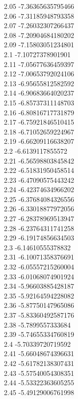 {2.05	-7.36365635795466\\
2.06	-7.31185948793358\\
2.07	-7.26032307266437\\
2.08	-7.20904684180202\\
2.09	-7.15803051234801\\
2.1	-7.10727378901901\\
2.11	-7.05677636459397\\
2.12	-7.00653792024106\\
2.13	-6.95655812582592\\
2.14	-6.90683664020237\\
2.15	-6.85737311148703\\
2.16	-6.80816717731879\\
2.17	-6.75921846510415\\
2.18	-6.71052659224967\\
2.19	-6.66209116638207\\
2.2	-6.6139117855572\\
2.21	-6.56598803845842\\
2.22	-6.51831950458514\\
2.23	-6.47090575443242\\
2.24	-6.42374634966202\\
2.25	-6.37684084326556\\
2.26	-6.33018877972056\\
2.27	-6.28378969513947\\
2.28	-6.23764311741258\\
2.29	-6.19174856634503\\
2.3	-6.14610555378832\\
2.31	-6.10071358376691\\
2.32	-6.05557215260004\\
2.33	-6.01068074901924\\
2.34	-5.96603885428187\\
2.35	-5.92164594228082\\
2.36	-5.87750147965086\\
2.37	-5.83360492587176\\
2.38	-5.7899557333684\\
2.39	-5.74655334760819\\
2.4	-5.70339720719592\\
2.41	-5.66048674396631\\
2.42	-5.61782138307431\\
2.43	-5.57540054308351\\
2.44	-5.53322363605255\\
2.45	-5.49129006761998\\
}

